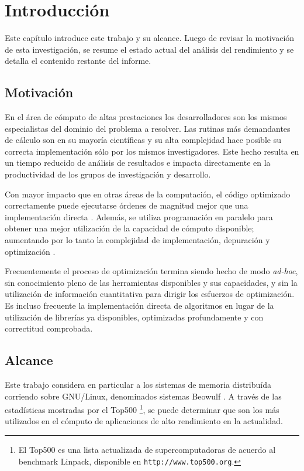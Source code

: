 \documentclass[a4paper]{report}
\begin{document}
\tableofcontents

\chapter{Introducci\'on}

Este cap\'itulo introduce este trabajo y su alcance. Luego de revisar la
motivaci\'on de esta investigaci\'on, se resume el estado actual del an\'alisis
del rendimiento y se detalla el contenido restante del informe.

\section{Motivaci\'on}

En el \'area de c\'omputo de altas prestaciones los desarrolladores son los mismos
especialistas del dominio del problema a resolver. Las rutinas
m\'as demandantes de c\'alculo son en su mayor\'ia cient\'ificas y su
alta complejidad hace posible su correcta implementaci\'on s\'{o}lo por los mismos investigadores.
Este hecho resulta en un tiempo reducido de an\'alisis de resultados
e impacta directamente en la productividad de los grupos de investigaci\'on y
desarrollo.

\bigskip

Con mayor impacto que en otras \'areas de la computaci\'on, el c\'odigo
optimizado correctamente puede ejecutarse \'ordenes de magnitud mejor que una implementaci\'on
directa \cite{mm-matrixmultiplicationtool}. Adem\'as, se utiliza
programaci\'on en paralelo para obtener una mejor utilizaci\'on de la
capacidad de c\'omputo disponible; aumentando por lo tanto la complejidad de
implementaci\'on, depuraci\'on y optimizaci\'on \cite{parallel-programming}.

\bigskip

Frecuentemente el proceso de optimizaci\'on termina siendo
hecho de modo {\it ad-hoc}, sin conocimiento pleno de las herramientas disponibles y
sus capacidades, y sin la utilizaci\'on de informaci\'on cuantitativa para dirigir los
esfuerzos de optimizaci\'on. Es incluso frecuente la implementaci\'on directa
de algoritmos en lugar de la utilizaci\'on de librer\'ias ya disponibles, optimizadas
profundamente y con correctitud comprobada.

\section{Alcance}

Este trabajo considera en particular a los sistemas de memoria distribu\'ida corriendo sobre
GNU/Linux, denominados sistemas Beowulf \cite{beowulf}. A trav\'es de las
estad\'isticas mostradas por el Top500 \footnote{El Top500 es una lista actualizada de supercomputadoras
de acuerdo al benchmark Linpack, disponible en {\tt http://www.top500.org}.}, se
puede determinar que son los m\'as utilizados en el c\'omputo de aplicaciones de alto rendimiento en la actualidad.
\end{document}
